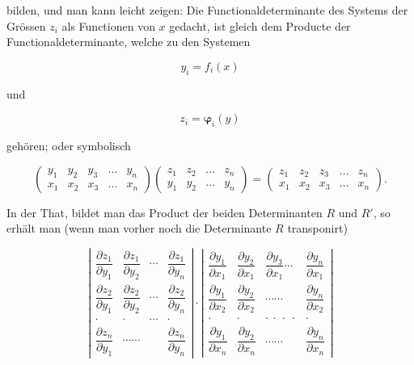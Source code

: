 \documentclass[11pt]{article}
\providecommand{\weq}[2]{\begin{equation}\tag{#1}#2\end{equation}}
\begin{document}
bilden, und man kann leicht zeigen: Die Functionaldeterminante des
Systems der Grössen $z_i$ als Functionen von $x$ gedacht, ist gleich dem
Producte der Functionaldeterminante, welche zu den Systemen

\[
y_i = f_i(x)
\]

und

\[
z_i = \boldsymbol{\varphi}_i(y)
\]

gehören; oder symbolisch

\weq{1}{
\begin{pmatrix} y_1 & y_2 & y_3 & \ldots & y_n \\ x_1 & x_2 & x_3 & \ldots & x_n \end{pmatrix}
\begin{pmatrix} z_1 & z_2 & \ldots & z_n \\ y_1 & y_2 & \ldots & y_n \end{pmatrix}
=
\begin{pmatrix} z_1 & z_2 & z_3 & \ldots & z_n \\ x_1 & x_2 & x_3 & \ldots & x_n \end{pmatrix}.
}

In der That, bildet man das Product der beiden Determinanten $R$
und $R'$, so erhält man (wenn man vorher noch die Determinante $R$
transponirt)

\[
\left|
\begin{array}{cccc}
\dfrac{\partial z_1}{\partial y_1} & \dfrac{\partial z_1}{\partial y_2} & \cdots & \dfrac{\partial z_1}{\partial y_n} \\[2ex]
\dfrac{\partial z_2}{\partial y_1} & \dfrac{\partial z_2}{\partial y_2} & \cdots & \dfrac{\partial z_2}{\partial y_n} \\[2ex]
\cdot & \cdot & \cdots & \cdot \\[2ex]
\dfrac{\partial z_n}{\partial y_1} & \cdots\cdots & & \dfrac{\partial z_n}{\partial y_n}
\end{array}
\right|
\cdot
\left|
\begin{array}{cccc}
\dfrac{\partial y_1}{\partial x_1} & \dfrac{\partial y_2}{\partial x_1} & \dfrac{\partial y_3}{\partial x_1} \cdots & \dfrac{\partial y_n}{\partial x_1} \\[2ex]
\dfrac{\partial y_1}{\partial x_2} & \dfrac{\partial y_2}{\partial x_2} & \cdots\cdots & \dfrac{\partial y_n}{\partial x_2} \\[2ex]
\cdot & \cdot & \cdot\ \cdot\ \cdot\ \cdot & \cdot \\[2ex]
\dfrac{\partial y_1}{\partial x_n} & \dfrac{\partial y_2}{\partial x_n} & \cdots\cdots & \dfrac{\partial y_n}{\partial x_n}
\end{array}
\right|
\]
\end{document}
